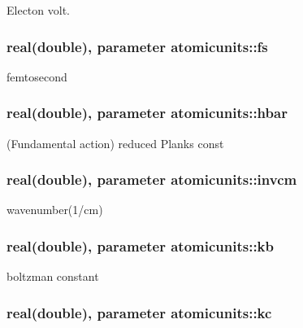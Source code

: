 Electon volt. 

\hypertarget{classatomicunits_a51f9c61f64f3aec674dd6dbb342e733d}{
\subsubsection[{fs}]{\setlength{\rightskip}{0pt plus 5cm}real(double), parameter atomicunits\+::fs}}\label{classatomicunits_a51f9c61f64f3aec674dd6dbb342e733d}


femtosecond 

\hypertarget{classatomicunits_a7dffaade5d28d129a3726e8eff794447}{
\subsubsection[{hbar}]{\setlength{\rightskip}{0pt plus 5cm}real(double), parameter atomicunits\+::hbar}}\label{classatomicunits_a7dffaade5d28d129a3726e8eff794447}


(Fundamental action) reduced Planks const 

\hypertarget{classatomicunits_a1741cd0f8cdd696033c1c18531740795}{
\subsubsection[{invcm}]{\setlength{\rightskip}{0pt plus 5cm}real(double), parameter atomicunits\+::invcm}}\label{classatomicunits_a1741cd0f8cdd696033c1c18531740795}


wavenumber(1/cm) 

\hypertarget{classatomicunits_afe876defe82137d91908691c6765a5f1}{
\subsubsection[{kb}]{\setlength{\rightskip}{0pt plus 5cm}real(double), parameter atomicunits\+::kb}}\label{classatomicunits_afe876defe82137d91908691c6765a5f1}


boltzman constant 

\hypertarget{classatomicunits_aafc175708d34f52459448530cdec9aae}{
\subsubsection[{kc}]{\setlength{\rightskip}{0pt plus 5cm}real(double), parameter atomicunits\+::kc}}\label{classatomicunits_aafc175708d34f52459448530cdec9aae}


